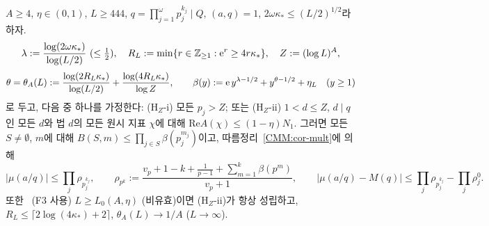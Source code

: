 \begin{theorem}\label{CMM:thm-main}
$A\ge4$, $\eta\in(0,1)$, $L\ge444$, $q=\prod_{j=1}^\omega p_j^{k_j}\mid Q$, $(a,q)=1$, $2\omega\kappa_*\le(L/2)^{1/2}$라 하자.
\[
\lambda:=\frac{\log(2\omega\kappa_*)}{\log(L/2)}\ (\le\tfrac12),\quad R_L:=\min\{r\in\Z_{\ge1}:\e^r\ge4r\kappa_*\},\quad Z:=(\log L)^A,
\]
\[
\theta=\theta_A(L):=\frac{\log(2R_L\kappa_*)}{\log(L/2)}+\frac{\log(4R_L\kappa_*)}{\log Z},\qquad
\beta(y):=\mathrm{e}\,y^{\lambda-1/2}+y^{\theta-1/2}+\eta_L\quad(y\ge1)
\]
로 두고, 다음 중 하나를 가정한다:
(H$_Z$-i) 모든 $p_j>Z$; 또는 (H$_Z$-ii) $1<d\le Z$, $d\mid q$인 모든 $d$와 법 $d$의 모든 원시 지표 $\chi$에 대해 $\mathrm{Re}A(\chi)\le(1-\eta)N_1$.
그러면 모든 $S\ne\emptyset$, $m$에 대해 $B(S,m)\le\prod_{j\in S}\beta(p_j^{m_j})$이고, 따름정리~\ref{CMM:cor-mult}에 의해
\[
|\mu(a/q)|\le\prod_{j}\rho_{p_j^{k_j}},\qquad \rho_{p^k}:=\frac{v_p+1-k+\frac1{p-1}+\sum_{m=1}^{k}\beta(p^m)}{v_p+1},\qquad
|\mu(a/q)-M(q)|\le\prod_j\rho_{p_j^{k_j}}-\prod_j\rho^0_j .
\]
또한 \PROVED\ (F3 사용) $L\ge L_0(A,\eta)$ (비유효)이면 (H$_Z$-ii)가 항상 성립하고,
\PROVED\ $R_L\le\lceil2\log(4\kappa_*)+2\rceil$, $\theta_A(L)\to1/A$ ($L\to\infty$).
\end{theorem}
